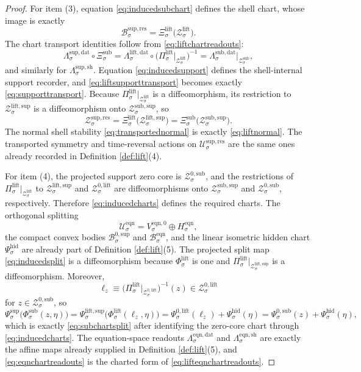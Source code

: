 \documentclass[11pt]{article}
\newcommand{\EqnSpace}[1]{\mathcal U_{#1}^{\mathrm{eqn}}}
\newcommand{\EqnBody}[1]{\mathcal B_{#1}^{\mathrm{eqn}}}
\newcommand{\EqnData}[1]{\Lambda_{#1}^{\mathrm{eqn,dat}}}
\newcommand{\EqnShell}[1]{\Lambda_{#1}^{\mathrm{eqn,sh}}}
\newcommand{\EqnZero}[1]{V_{#1}^{\mathrm{eqn},0}}
\newcommand{\EqnHidden}[1]{H_{#1}^{\mathrm{eqn}}}
\newcommand{\ResSpace}[1]{\mathcal U_{#1}^{\mathrm{sup,res}}}
\newcommand{\ResBody}[1]{\mathcal B_{#1}^{\mathrm{sup,res}}}
\newcommand{\ResData}[1]{\Lambda_{#1}^{\mathrm{sup,dat}}}
\newcommand{\ResShellMap}[1]{\Lambda_{#1}^{\mathrm{sup,sh}}}
\newcommand{\ResShellSet}[1]{\mathcal Z_{#1}^{\mathrm{sup,res}}}
\newcommand{\ZeroBody}[1]{\mathcal B_{#1}^{0,\mathrm{sup}}}
\newcommand{\SubShellSet}[1]{\mathcal Z_{#1}^{\mathrm{sub}}}
\newcommand{\SubData}[1]{\Lambda_{#1}^{\mathrm{sub,dat}}}
\newcommand{\SubChart}[1]{\Xi_{#1}^{\mathrm{sub}}}
\newcommand{\SubSupportShell}[1]{\mathcal Z_{#1}^{\mathrm{sub,sup}}}
\newcommand{\SubZeroCore}[1]{\mathcal Z_{#1}^{0,\mathrm{sub}}}
\newcommand{\ShellChart}[1]{\Psi_{#1}^{\mathrm{sup}}}
\newcommand{\SubZeroChart}[1]{\Psi_{#1}^{0,\mathrm{sub}}}
\newcommand{\HiddenChart}[1]{\Psi_{#1}^{\mathrm{hid}}}
\newcommand{\SubSplit}[1]{\Phi_{#1}^{\mathrm{sub}}}
\newcommand{\LiftProj}[1]{\Pi_{#1}^{\mathrm{lift}}}
\newcommand{\LiftData}[1]{\Lambda_{#1}^{\mathrm{lift,dat}}}
\newcommand{\LiftShellSet}[1]{\mathcal Z_{#1}^{\mathrm{lift}}}
\newcommand{\LiftChart}[1]{\Xi_{#1}^{\mathrm{lift}}}
\newcommand{\LiftSupportShell}[1]{\mathcal Z_{#1}^{\mathrm{lift,sup}}}
\newcommand{\LiftZeroCore}[1]{\mathcal Z_{#1}^{0,\mathrm{lift}}}
\newcommand{\LiftEqChart}[1]{\Psi_{#1}^{\mathrm{lift,sup}}}
\newcommand{\LiftZeroChart}[1]{\Psi_{#1}^{0,\mathrm{lift}}}
\newcommand{\LiftSplit}[1]{\Phi_{#1}^{\mathrm{lift}}}
\begin{document}
\begin{proof}
For item (3), equation \eqref{eq:inducedsubchart} defines the shell chart, whose image is exactly
\[
\ResBody{\sigma}
=
\LiftChart{\sigma}\bigl(\LiftShellSet{\sigma}\bigr).
\]
The chart transport identities follow from \eqref{eq:liftchartreadouts}:
\[
\ResData{\sigma}\circ\SubChart{\sigma}
=
\LiftData{\sigma}\circ
\bigl(\LiftProj{\sigma}\big|_{\LiftShellSet{\sigma}}\bigr)^{-1}
=
\SubData{\sigma}\big|_{\SubShellSet{\sigma}},
\]
and similarly for \(\ResShellMap{\sigma}\). Equation \eqref{eq:inducedsupport} defines the shell-internal support recorder, and \eqref{eq:liftsupporttransport} becomes exactly \eqref{eq:supporttransport}. Because \(\LiftProj{\sigma}\big|_{\LiftShellSet{\sigma}}\) is a diffeomorphism, its restriction to \(\LiftSupportShell{\sigma}\) is a diffeomorphism onto \(\SubSupportShell{\sigma}\), so
\[
\ResShellSet{\sigma}
=
\LiftChart{\sigma}\bigl(\LiftSupportShell{\sigma}\bigr)
=
\SubChart{\sigma}\bigl(\SubSupportShell{\sigma}\bigr).
\]
The normal shell stability \eqref{eq:transportednormal} is exactly \eqref{eq:liftnormal}. The transported symmetry and time-reversal actions on \(\ResSpace{\sigma}\) are the same ones already recorded in Definition \ref{def:lift}(4).

For item (4), the projected support zero core is \(\SubZeroCore{\sigma}\), and the restrictions of \(\LiftProj{\sigma}\big|_{\LiftShellSet{\sigma}}\) to \(\LiftSupportShell{\sigma}\) and \(\LiftZeroCore{\sigma}\) are diffeomorphisms onto \(\SubSupportShell{\sigma}\) and \(\SubZeroCore{\sigma}\), respectively. Therefore \eqref{eq:inducedcharts} defines the required charts. The orthogonal splitting
\[
\EqnSpace{\sigma}=\EqnZero{\sigma}\oplus\EqnHidden{\sigma},
\]
the compact convex bodies \(\ZeroBody{\sigma}\) and \(\EqnBody{\sigma}\), and the linear isometric hidden chart \(\HiddenChart{\sigma}\) are already part of Definition \ref{def:lift}(5). The projected split map \eqref{eq:inducedsplit} is a diffeomorphism because \(\LiftSplit{\sigma}\) is one and \(\LiftProj{\sigma}\big|_{\LiftSupportShell{\sigma}}\) is a diffeomorphism. Moreover,
\[
\ell_{z}
\equiv
\bigl(\LiftProj{\sigma}\big|_{\LiftZeroCore{\sigma}}\bigr)^{-1}(z)
\in
\LiftZeroCore{\sigma}
\]
for \(z\in\SubZeroCore{\sigma}\), so
\[
\ShellChart{\sigma}\bigl(\SubSplit{\sigma}(z,\eta)\bigr)
=
\LiftEqChart{\sigma}\bigl(\LiftSplit{\sigma}(\ell_{z},\eta)\bigr)
=
\LiftZeroChart{\sigma}(\ell_{z})+\HiddenChart{\sigma}(\eta)
=
\SubZeroChart{\sigma}(z)+\HiddenChart{\sigma}(\eta),
\]
which is exactly \eqref{eq:subchartsplit} after identifying the zero-core chart through \eqref{eq:inducedcharts}. The equation-space readouts \(\EqnData{\sigma}\) and \(\EqnShell{\sigma}\) are exactly the affine maps already supplied in Definition \ref{def:lift}(5), and \eqref{eq:eqnchartreadouts} is the charted form of \eqref{eq:lifteqnchartreadouts}.


\end{proof}
\end{document}
